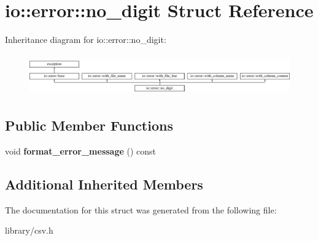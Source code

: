 \hypertarget{structio_1_1error_1_1no__digit}{}\section{io\+:\+:error\+:\+:no\+\_\+digit Struct Reference}
\label{structio_1_1error_1_1no__digit}
Inheritance diagram for io\+:\+:error\+:\+:no\+\_\+digit\+:\begin{figure}[H]
\begin{center}
\leavevmode
\includegraphics[height=1.787234cm]{structio_1_1error_1_1no__digit}
\end{center}
\end{figure}
\subsection*{Public Member Functions}
\begin{DoxyCompactItemize}
\item 
\mbox{\label{structio_1_1error_1_1no__digit_a469275c63f67171903f9cdb2418da5b3}} 
void {\bfseries format\+\_\+error\+\_\+message} () const
\end{DoxyCompactItemize}
\subsection*{Additional Inherited Members}


The documentation for this struct was generated from the following file\+:\begin{DoxyCompactItemize}
\item 
library/csv.\+h\end{DoxyCompactItemize}
